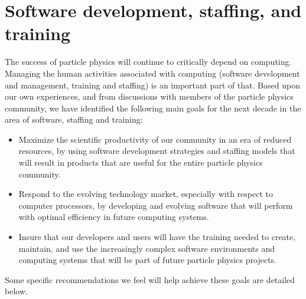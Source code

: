 \section{Software development, staffing, and training}

The success of particle physics will continue to critically depend on computing.
Managing the human activities associated with computing
(software development and management,
training and staffing) is an important part of that.  
Based upon our own experiences, and from
discussions with members of the particle physics community,
we have identified the following main goals for the next decade in the area
of software, staffing and training:

\begin{itemize}
\item Maximize the scientific productivity of our community
in an era of reduced resources, by using
software development strategies and staffing models that will result in products
that are useful for the entire particle physics community.
\item Respond to the evolving technology market, especially
with respect to computer processors, by
developing and evolving software that will perform with optimal efficiency
in future computing systems.
\item Insure that our developers and users will have the
training needed to create, maintain, and use the increasingly complex software
environments and computing systems that will be part of future 
particle physics projects.
\end{itemize}

Some specific recommendations we feel will help achieve these goals are detailed
below.

